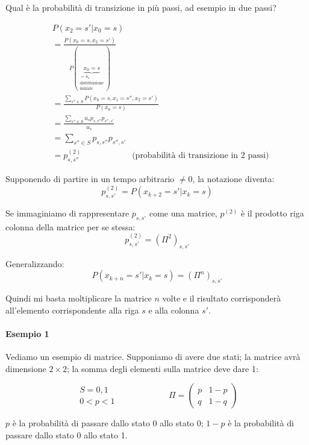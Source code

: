 \documentclass[a4paper,12pt]{book}
\begin{document}
Qual è la probabilità di transizione in più passi, ad esempio in due passi?

\begin{align*}
	& P(x_2 = s' | x_0 = s) \\
	& = \frac{P(x_0 = s, x_2 = s')}{P(\underbrace{x_0 = s}_{\substack{ = u_s \\ \text{distribuzione} \\ \text{iniziale}}}  )} \\
	& = \frac{\sum_{s'' \in S} P(x_0 = s, x_1 = s'', x_2 = s')}{P(x_0 = s)} \\
	& = \frac{\sum_{s'' \in S} u_s p_{s, s''} p_{s'', s'}}{u_s} \\
	& = \sum_{s'' \in S} p_{s,s''}p_{s'', s'} \\
	& = p_{s, s''}^{(2)} \qquad \qquad \qquad \text{(probabilità di transizione in 2 passi)}
\end{align*}

Supponendo di partire in un tempo arbitrario $\ne 0$, la notazione diventa:
 $$ p_{s,s'}^{(2)} = P(x_{k+2} = s' | x_k = s)$$

Se immaginiamo di rappresentare $ p_{s,s'} $ come una matrice, $ p^{(2)} $ è il prodotto riga colonna della matrice per se stessa:
$$ p_{s,s'}^{(2)} = (\Pi^2)_{s,s'}$$

Generalizzando:
$$ P(x_{k+n} = s' | x_k = s) = (\Pi^n)_{s,s'} $$

Quindi mi basta moltiplicare la matrice $ n $ volte e il risultato corrisponderà all'elemento corrispondente alla riga $ s $ e alla colonna $ s' $. 

\paragraph{Esempio 1} Vediamo un esempio di matrice. Supponiamo di avere due stati; la matrice avrà dimensione $ 2 \times 2 $; la somma degli elementi sulla matrice deve dare 1:

$$ 
	\begin{array}{c}
		S = {0, 1} \\
		0 < p < 1
	\end{array}
	\qquad \qquad \qquad \Pi = \left(\begin{array}{cc}
	 	p & 1-p \\
	 	q & 1-q
	\end{array}\right)
$$

$ p $ è la probabilità di passare dallo stato 0 allo stato 0; $ 1-p $ è la probabilità di passare dallo stato 0 allo stato 1.
\end{document}
